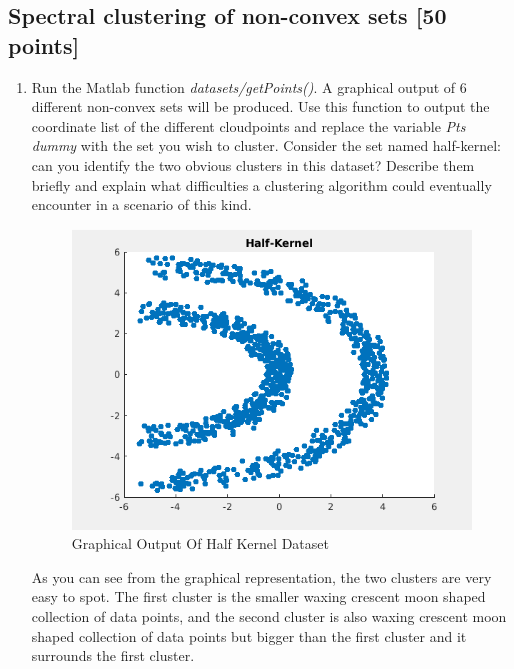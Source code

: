 \documentclass[unicode,11pt,a4paper,oneside,numbers=endperiod,openany]{scrartcl}
\begin{document}
\setassignment
{}

\newline

\assignmentpolicy


\newpage

\subsection{Spectral clustering of non-convex sets [50 points]}
\begin{enumerate} 
\item Run the Matlab function \textit{datasets/getPoints()}. A graphical output of 6 different non-convex sets will
be produced. Use this function to output the coordinate list of the different cloudpoints and replace the variable
\textit{Pts dummy} with the set you wish to cluster. Consider the set named half-kernel: can you identify the two
obvious clusters in this dataset? Describe them briefly and explain what difficulties a clustering algorithm could
eventually encounter in a scenario of this kind.\\

 \begin{figure}[h!]
    \begin{minipage}[c]{1\linewidth}
        \centering
        \includegraphics[width=0.8\linewidth]{./figures/halfkernel.png}
    \end{minipage}
  \caption{Graphical Output Of Half Kernel Dataset}
\end{figure}
As you can see from the graphical representation, the two clusters are very easy to spot. The first cluster is the smaller waxing crescent moon shaped collection of data points, and the second cluster is also waxing crescent moon shaped collection of data points but bigger than the first cluster and it surrounds the first cluster.\\


\end{enumerate}
\end{document}
